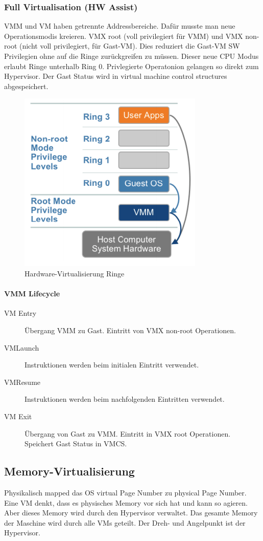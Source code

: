 \subsubsection{Full Virtualisation (HW Assist)}
\label{sec:hw-unterstuetzt-virt}
VMM und VM haben getrennte Addressbereiche. Dafür musste man neue Operationsmodis kreieren. VMX root (voll privilegiert für VMM) und VMX non-root (nicht voll privilegiert, für Gast-VM). Dies reduziert die Gast-VM SW Privilegien ohne auf die Ringe zurückgreifen zu müssen. Dieser neue CPU Modus erlaubt Ringe unterhalb Ring 0. Privlegierte Operatonion gelangen so direkt zum Hypervisor. Der Gast Status wird in virtual machine control structures abgespeichert.
\begin{figure}[h!]
\centering
\includegraphics[width=0.3\linewidth]{fig/hw-virtualisierung-ringe}
\caption{Hardware-Virtualisierung Ringe}
\label{fig:hw-virtualisierung-ringe}
\end{figure}

\paragraph{VMM Lifecycle}
\label{sec:vmm-lifecycle}
\begin{description}
	\item[VM Entry] Übergang VMM zu Gast. Eintritt von VMX non-root Operationen.
	\item[VMLaunch] Instruktionen werden beim initialen Eintritt verwendet. 
	\item[VMResume] Instruktionen werden beim nachfolgenden Eintritten verwendet.
	\item[VM Exit] Übergang von Gast zu VMM. Eintritt in VMX root Operationen. Speichert Gast Status in VMCS.
\end{description}

\subsection{Memory-Virtualisierung}
Physikalisch mapped das OS virtual Page Number zu physical Page Number. Eine VM denkt, dass es physisches Memory vor sich hat und kann so agieren. Aber dieses Memory wird durch den Hypervisor verwaltet. Das gesamte Memory der Maschine wird durch alle VMs geteilt. Der Dreh- und Angelpunkt ist der Hypervisor.

